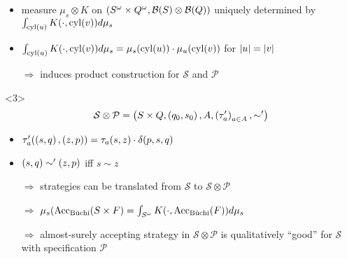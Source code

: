 \documentclass{beamer}
\begin{document}
\begin{frame}
\begin{overlayarea}{\textwidth}{0.8\textheight}
\begin{onlyenv}
\begin{itemize}
          \item measure $\mu_{s}\otimes K$ on $\left(S^{\omega}\times
            Q^{\omega}, \mathcal{B}(S)\otimes\mathcal{B}(Q)\right)$ uniquely
            determined by $\int_{\operatorname{cyl}(u)}K(\cdot, \operatorname{cyl}(v))d\mu_{s}$
          \item $\int_{\operatorname{cyl}(u)}K(\cdot, \operatorname{cyl}(v))d\mu_{s} =
            \mu_{s}(\operatorname{cyl}(u))\cdot\mu_{u}(\operatorname{cyl}(v))$ for $\left\vert{u}\right\vert = \left\vert{v}\right\vert$
          \item[$\Rightarrow$] induces product construction for
            $\mathcal{S}$ and $\mathcal{P}$
        \end{itemize}
      \end{onlyenv}
      \begin{onlyenv}<3>
        \begin{equation*}
          \mathcal{S}\otimes\mathcal{P} = \left(
            S\times Q, \left(q_{0}, s_{0}\right), A, \left(\tau_{a}'\right)_{a\in A},
            \sim'
          \right)
        \end{equation*}
        \begin{itemize}
          \item $\tau_{a}'(\left(s, q\right), \left(z, p\right)) = \tau_{a}(s, z)
            \cdot \delta(p, s, q)$
          \item $\left(s, q\right)\sim'\left(z, p\right)$ iff $s\sim z$
          \item[$\Rightarrow$] strategies can be translated from
            $\mathcal{S}$ to $\mathcal{S}\otimes\mathcal{P}$
          \item[$\Rightarrow$] $\mu_{s}(\operatorname{Acc}_{\operatorname{B\ddot{u}chi}}(S\times F) =
            \int_{S^{\omega}}K(\cdot, \operatorname{Acc}_{\operatorname{B\ddot{u}chi}}(F))d\mu_{s}$
          \item[$\Rightarrow$] almost-surely accepting strategy in
            $\mathcal{S}\otimes\mathcal{P}$ is qualitatively \enquote{good}
            for $\mathcal{S}$ with specification $\mathcal{P}$
        \end{itemize}
      \end{onlyenv}
  \end{overlayarea}
\end{frame}
\end{document}
